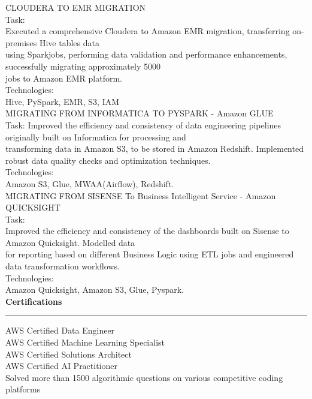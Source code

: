 \documentclass[11pt,a4paper]{article}
\renewcommand{\section}[1]{%
  \vspace{12pt}%
  {\large\bfseries #1}%
  \vspace{6pt}%
  \hrule%
  \vspace{6pt}%
}
\begin{document}
CLOUDERA TO EMR MIGRATION\\[0.2cm]
Task:\\[0.2cm]
Executed a comprehensive Cloudera to Amazon EMR migration, transferring on-premises Hive tables data\\[0.2cm]
using Sparkjobs, performing data validation and performance enhancements, successfully migrating approximately 5000\\[0.2cm]
jobs to Amazon EMR platform.\\[0.2cm]
Technologies:\\[0.2cm]
Hive, PySpark, EMR, S3, IAM\\[0.2cm]
MIGRATING FROM INFORMATICA TO PYSPARK - Amazon GLUE\\[0.2cm]
Task: Improved the efficiency and consistency of data engineering pipelines originally built on Informatica for processing and\\[0.2cm]
transforming data in Amazon S3, to be stored in Amazon Redshift. Implemented robust data quality checks and optimization techniques.\\[0.2cm]
Technologies:\\[0.2cm]
Amazon S3, Glue, MWAA(Airflow), Redshift.\\[0.2cm]
MIGRATING FROM SISENSE To Business Intelligent Service - Amazon QUICKSIGHT\\[0.2cm]
Task:\\[0.2cm]
Improved the efficiency and consistency of the dashboards built on Sisense to Amazon Quicksight. Modelled data\\[0.2cm]
for reporting based on different Business Logic using ETL jobs and engineered data transformation workflows.\\[0.2cm]
Technologies:\\[0.2cm]
Amazon Quicksight, Amazon S3, Glue, Pyspark.\\[0.2cm]
\section{Certifications}

AWS Certified Data Engineer\\[0.2cm]
AWS Certified Machine Learning Specialist\\[0.2cm]
AWS Certified Solutions Architect\\[0.2cm]
AWS Certified AI Practitioner\\[0.2cm]
Solved more than 1500 algorithmic questions on various competitive coding platforms\\[0.2cm]
\end{document}
